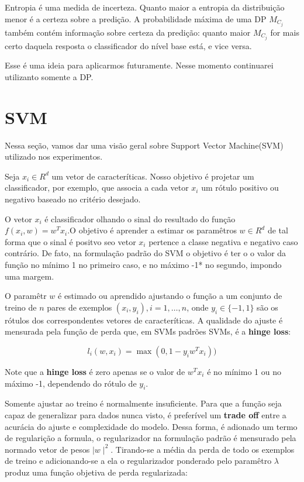 \documentclass[]{article}
\begin{document}
Entropia é uma medida de incerteza. Quanto maior a entropia da
distribuição menor é a certeza sobre a predição. A probabilidade máxima
de uma DP \(M_{C_j}\) também contém informação sobre certeza da
predição: quanto maior \(M_{C_j}\) for mais certo daquela resposta o
classificador do nível base está, e vice versa.

Esse é uma ideia para aplicarmos futuramente. Nesse momento continuarei
utilizanto somente a DP.

\section{SVM}\label{svm}

Nessa seção, vamos dar uma visão geral sobre Support Vector Machine(SVM)
utilizado nos experimentos.

Seja \(x_i \in R^d\) um vetor de caracteríticas. Nosso objetivo é
projetar um classificador, por exemplo, que associa a cada vetor \(x_i\)
um rótulo positivo ou negativo baseado no critério desejado.

O vetor \(x_i\) é classificador olhando o sinal do resultado do função
\(f(x_i,w) = w^Tx_i\).O objetivo é aprender a estimar os paramêtros
\(w \in R^d\) de tal forma que o sinal é positvo seo vetor \(x_i\)
pertence a classe negativa e negativo caso contrário. De fato, na
formulação padrão do SVM o objetivo é ter o o valor da função no mínimo
1 no primeiro caso, e no máximo -1* no segundo, impondo uma margem.

O paramêtr \(w\) é estimado ou aprendido ajustando o função a um
conjunto de treino de \(n\) pares de exemplos \((x_i,y_i),i=1,…,n\),
onde \(y_i \in \{-1,1\}\) são os rótulos dos correspondentes vetores de
caracteríticas. A qualidade do ajuste é mensurada pela função de perda
que, em SVMs padrões SVMs, é a \textbf{hinge loss}:

\begin{equation}
l_i(w,x_i)=\max(0,1-y_iw^Tx_i))
\end{equation}

Note que a \textbf{hinge loss} é zero apenas se o valor de \(w^Tx_i\) é
no mínimo 1 ou no máximo -1, dependendo do rótulo de \(y_i\).

Somente ajustar ao treino é normalmente insuficiente. Para que a função
seja capaz de generalizar para dados nunca visto, é preferível um
\textbf{trade off} entre a acurácia do ajuste e complexidade do modelo.
Dessa forma, é adionado um termo de regularição a formula, o
regularizador na formulação padrão é mensurado pela normado vetor de
pesos \(\mid w\mid^2\). Tirando-se a média da perda de todo os exemplos
de treino e adicionando-se a ela o regularizador ponderado pelo
paramêtro \(\lambda\) produz uma função objetiva de perda regularizada:
\end{document}
